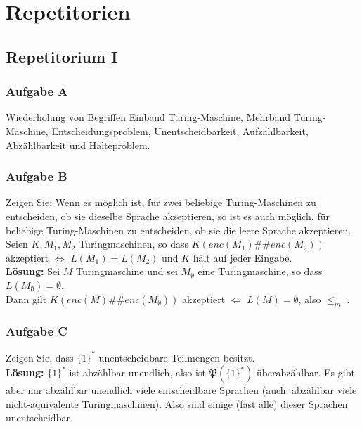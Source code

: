 \section{Repetitorien}
\subsection{Repetitorium I}
\subsubsection*{Aufgabe A}
    Wiederholung von Begriffen Einband Turing-Maschine, Mehrband Turing-Maschine, Entscheidungsproblem, Unentscheidbarkeit, Aufzählbarkeit, Abzählbarkeit und Halteproblem.

\subsubsection*{Aufgabe B}
    Zeigen Sie: Wenn es möglich ist, für zwei beliebige Turing-Maschinen zu entscheiden, ob sie dieselbe Sprache akzeptieren, so ist es auch möglich, für beliebige Turing-Maschinen zu entscheiden, ob sie die leere Sprache akzeptieren. Seien $K, M_1, M_2$ Turingmaschinen, so dass $K(enc(M_1)\#\#enc(M_2))$ akzeptiert $\Leftrightarrow$ $L(M_1) = L(M_2)$ und $K$ hält auf jeder Eingabe. \\
    \textbf{Lösung:} Sei $M$ Turingmaschine und sei $M_\emptyset$ eine Turingmaschine, so dass $L(M_\emptyset) = \emptyset$. \\
    Dann gilt $K(enc(M)\#\#enc(M_\emptyset))$ akzeptiert $\Leftrightarrow$ $L(M) = \emptyset$, also  $\leq_m$ .

\subsubsection*{Aufgabe C}
    Zeigen Sie, dass $\{1\}^*$ unentscheidbare Teilmengen besitzt. \\
    \textbf{Lösung:} $\{1\}^*$ ist abzählbar unendlich, also ist $\mathfrak{P}(\{1\}^*)$ überabzählbar. Es gibt aber nur abzählbar unendlich viele entscheidbare Sprachen (auch: abzählbar viele nicht-äquivalente Turingmaschinen). Also sind einige (fast alle) dieser Sprachen unentscheidbar.

